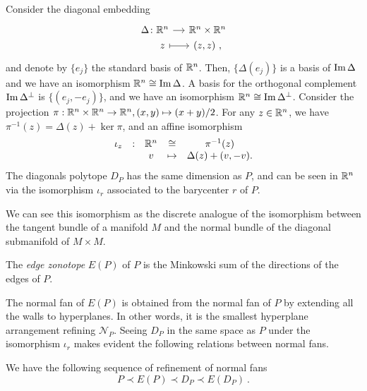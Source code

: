Consider the diagonal embedding
\[
\begin{tikzcd}[row sep=0, column sep=small]
	\Delta \colon \R^n \arrow{r} & \R^n \times \R^n \\
	\phantom{\Delta \colon} z \arrow[r, |->] & (z,z) \ ,
\end{tikzcd}
\]
and denote by $\{e_j\}$ the standard basis of $\mathbb{R}^n$.
Then, $\{\Delta (e_j)\}$ is a basis of $\operatorname{\mathrm{Im}} \Delta$ and we have an isomorphism $\mathbb{R}^n \cong \operatorname{\mathrm{Im}} \Delta$.
A basis for the orthogonal complement $\operatorname{\mathrm{Im}} \Delta^{\bot}$ is $\{(e_j,-e_j)\}$, and we have an isomorphism $\mathbb{R}^n \cong \operatorname{\mathrm{Im}} \Delta^{\bot}$.
Consider the projection $\pi : \mathbb{R}^n \times \mathbb{R}^n \to \mathbb{R}^n, (x,y) \mapsto (x+y)/2$. 
For any $z \in \mathbb{R}^n$, we have $\pi^{-1}(z)=\Delta(z)+\ker \pi$, and an affine isomorphism
\begin{equation} \label{eq:D_P-iso}
	\begin{matrix}
		\iota_z & : & \mathbb{R}^n & \cong & \pi^{-1}(z) \\
		& & v & \mapsto & \Delta(z)+(v,-v).
	\end{matrix}
\end{equation}
The diagonals polytope $D_P$ has the same dimension as $P$, and can be seen in $\mathbb{R}^n$ via the isomorphism $\iota_r$ associated to the barycenter $r$ of $P$.

\begin{remark}
	We can see this isomorphism as the discrete analogue of the isomorphism between the tangent bundle of a manifold $M$ and the normal bundle of the diagonal submanifold of $M\times M$.
\end{remark}

\begin{definition}
	\label{d:edgezonotope}
	The \emph{edge zonotope} $E(P)$ of $P$ is the Minkowski sum of the directions of the edges of $P$. 
\end{definition}

The normal fan of $E(P)$ is obtained from the normal fan of $P$ by extending all the walls to hyperplanes.
In other words, it is the smallest hyperplane arrangement refining $\mathcal{N}_P$. 
Seeing $D_P$ in the same space as $P$ under the isomorphism $\iota_r$ makes evident the following relations between normal fans. 
 
\begin{lemma}
	We have the following sequence of refinement of normal fans 
	\[
		P \prec E(P) \prec D_P \prec E(D_P) \ . 
	\]
\end{lemma}

